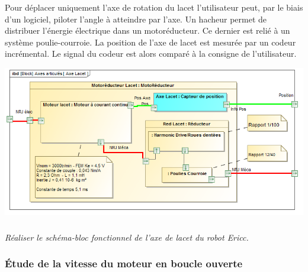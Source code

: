\documentclass[11pt,oneside]{article}
\begin{document}
\noindent\begin{minipage}[c]{.5\linewidth}

Pour déplacer uniquement l'axe de rotation du lacet l'utilisateur peut, par le biais d'un logiciel, piloter l'angle à atteindre par l'axe. Un hacheur permet de distribuer l'énergie électrique dans un motoréducteur. Ce dernier est relié à un système poulie-courroie. La position de l'axe de lacet est mesurée par un codeur incrémental. Le signal du codeur est alors comparé à la consigne de l'utilisateur.

\end{minipage} \hfill
\begin{minipage}[c]{.5\linewidth}
\begin{center}
\includegraphics[width=.95\linewidth]{png/bdi_lacet}
\end{center}
\end{minipage}



\subparagraph{}
\textit{Réaliser le schéma-bloc fonctionnel de l'axe de lacet du robot Ericc.}


\subsubsection*{Étude de la vitesse du moteur en boucle ouverte}
\end{document}
